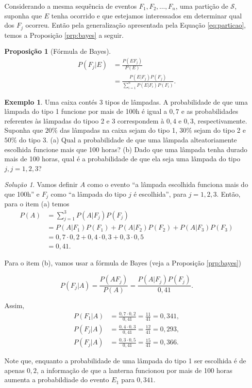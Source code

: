 \documentclass[]{book}
\newtheorem{proposition}{Proposição}[chapter]
\theoremstyle{definition}
\theoremstyle{definition}
\newtheorem{example}{Exemplo}[chapter]
\theoremstyle{definition}
\theoremstyle{remark}
\newtheorem*{solution}{Solução}
\begin{document}
Considerando a mesma sequência de eventos \(F_1, F_2, \ldots, F_n\), uma partição de \(\mathcal{S}\), suponha que \(E\) tenha ocorrido e que estejamos interessados em determinar qual dos \(F_j\) ocorreu.
Então pela generalização apresentada pela Equação \eqref{eq:particao}, temos a Proposição \ref{prp:bayes} a seguir.

\begin{proposition}[Fórmula de Bayes]
\protect\hypertarget{prp:bayes}{}{\label{prp:bayes} \iffalse (Fórmula de Bayes) \fi{} }\begin{align}
P(F_j|E) &= \frac{P(EF_j)}{P(E)}\\
&= \frac{P(E|F_j)P(F_j)}{\sum_{i=1}^{n}P(E|F_i)P(F_i)}.
\end{align}
\end{proposition}

\begin{example}
\protect\hypertarget{exm:unnamed-chunk-156}{}{\label{exm:unnamed-chunk-156} }Uma caixa contés 3 tipos de lâmpadas.
A probabilidade de que uma lâmpada do tipo 1 funcione por mais de 100h é igual a \(0{,}7\) e as probabilidades referentes às lâmpadas do tipoo 2 e 3 correspondem à \(0{,}4\) e \(0{,}3\), respectivamente.
Suponha que \(20\%\) das lâmpadas na caixa sejam do tipo 1, \(30\%\) sejam do tipo 2 e \(50\%\) do tipo 3.
(a) Qual a probabilidade de que uma lâmpada alteatoriamente escolhida funcione mais que 100 horas?
(b) Dado que uma lâmpada tenha durado mais de 100 horas, qual é a probabilidade de que ela seja uma lâmpada do tipo \(j, j=1,2,3\)?
\end{example}

\begin{solution}
\iffalse{} {Solução. } \fi{}Vamos definir \(A\) como o evento ``a lâmpada escolhida funciona mais do que 100h'' e \(F_j\) como ``a lâmpada do tipo \(j\) é escolhida'', para \(j=1,2,3\).
Então, para o item (a) temos
\begin{align}
P(A) & = \sum_{j=1}^{3}P(A|F_j)P(F_j)\\
& = P(A|F_1)P(F_1) + P(A|F_2)P(F_2) + P(A|F_3)P(F_3)\\
& = 0{,}7\cdot 0{,}2 + 0{,}4\cdot 0{,}3 + 0{,}3\cdot 0{,}5\\
&= 0{,}41.
\end{align}

Para o item (b), vamos usar a fórmula de Bayes (veja a Proposição \ref{prp:bayes})

\[P(F_j|A) = 
  \frac{P(AF_j)}{P(A)} = \frac{P(A|F_j)P(F_j)}{0{,}41}.\]

Assim,
\begin{align}
P(F_1|A) &= 
  \frac{0{,}7\cdot 0{,}2}{0{,}41} = \frac{11}{41} = 0{,}341, \\
P(F_j|A) &= 
  \frac{0{,}4\cdot 0{,}3}{0{,}41} = \frac{12}{41} = 0{,}293, \\
P(F_j|A) &= 
  \frac{0{,}3\cdot 0{,}5}{0{,}41} = \frac{15}{41} = 0{,}366.
\end{align}

Note que, enquanto a probabilidade de uma lâmpada do tipo 1 ser escolhida é de apenas \(0{,}2\), a informação de que a lanterna funcionou por mais de 100 horas aumenta a probabildiade do evento \(E_1\) para \(0{,}341\).
\end{solution}
\end{document}
